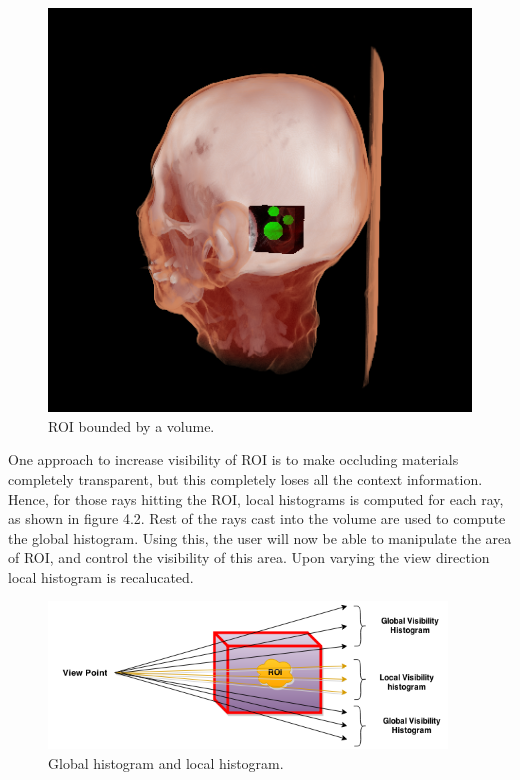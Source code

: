 \begin{figure}[!h]
\centering
\includegraphics[width=350pt]{Images/Vol-ROI.png}
\caption{\label{fig:ray_cast1.jpg} ROI bounded by a volume.}
\end{figure}

One approach to increase visibility of ROI is to make occluding materials completely transparent, but this completely loses all the context information. Hence, for those rays hitting the ROI, local histograms is computed for each ray, as shown in figure 4.2. Rest of the rays cast into the volume are used to compute the global histogram. Using this, the user will now be able to manipulate the area of ROI, and control the visibility of this area. Upon varying the view direction local histogram is recalucated. 


\begin{figure}[!h]
\centering
\includegraphics[width=300pt]{Images/pet-ct-roi.png}
\caption{\label{fig:ray_cast1.jpg} Global histogram and local histogram.}
\end{figure}
 

